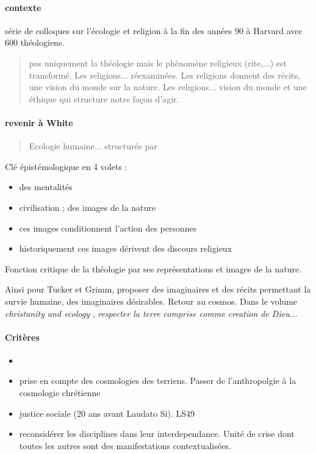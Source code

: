 \paragraph{contexte} série de colloques sur l'écologie et religion à la fin des années 90 à Harvard avec 600 théologiens. 
\begin{quote}
    pas uniquement la théologie mais le phénomène religieux (rite,...) est transformé.
    Les religions... réexaminées. Les religions donnent des récits, une vision du monde sur la nature. 
    Les religions... vision du monde et une éthique qui structure notre façon d'agir.
\end{quote}

\paragraph{revenir à White} 
\begin{quote}
    Ecologie humaine... structurée par 
\end{quote}
Clé épistémologique en 4 volets : 
\begin{itemize}
    \item des mentalités
    \item civilisation ; des images de la nature
    \item ces images conditionnent l'action des personnes
    \item historiquement ces images dérivent des discours religieux
\end{itemize}
Fonction critique de la théologie par ses représentations et images de la nature. 

Ainsi pour Tucker et Grimm, proposer des imaginaires et des récits permettant la survie humaine, des imaginaires désirables. 
Retour au cosmos. 
Dans le volume \textit{christanity and ecology} , \textit{respecter la terre comprise comme creation de Dieu...}

\paragraph{Critères}

\begin{itemize}
    \item 
    \item prise en compte des cosmologies des terriens. Passer de l'anthropolgie à la cosmologie chrétienne
    \item justice sociale (20 ans avant Laudato Si). LS49 
    \item reconsidérer les disciplines dans leur interdependance. Unité de crise dont toutes les autres sont des manifestations contextualisées. 
\end{itemize}

